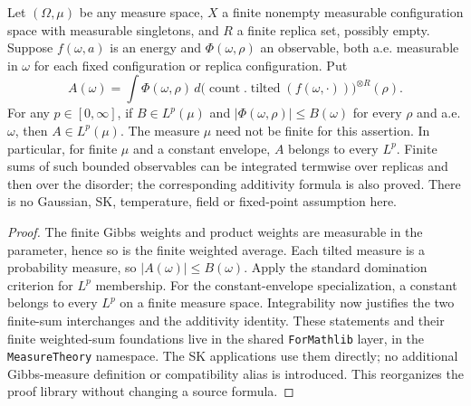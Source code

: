 \begin{lemma}
\label{lem:sg-tal:finite-tilted-calculus}
\leanok
{}
Let $(\Omega,\mu)$ be any measure space, $X$ a finite nonempty measurable configuration
space with measurable singletons, and $R$ a finite replica set, possibly empty.
Suppose $f(\omega,a)$ is an energy and $\Phi(\omega,\rho)$ an observable, both a.e.
measurable in $\omega$ for each fixed configuration or replica configuration. Put
\[
 A(\omega)=\int\Phi(\omega,\rho)\,
 d\bigl(\operatorname{count}.\operatorname{tilted}(f(\omega,\cdot))\bigr)^{\otimes R}(\rho).
\]
For any $p\in[0,\infty]$, if $B\in L^p(\mu)$ and
$|\Phi(\omega,\rho)|\le B(\omega)$ for every $\rho$ and a.e. $\omega$, then
$A\in L^p(\mu)$. The measure $\mu$ need not be finite for this assertion.
In particular, for finite $\mu$ and a constant envelope, $A$ belongs to every $L^p$.
Finite sums of such bounded observables can be integrated termwise over replicas
and then over the disorder; the corresponding additivity formula is also proved.
There is no Gaussian, SK, temperature, field or fixed-point assumption here.
\end{lemma}
\begin{proof}
\leanok
The finite Gibbs weights and product weights are measurable in the parameter, hence
so is the finite weighted average. Each tilted measure is a probability measure, so
$|A(\omega)|\le B(\omega)$. Apply the standard domination criterion for $L^p$ membership.
For the constant-envelope specialization, a constant belongs to every $L^p$ on a
finite measure space. Integrability now justifies the two finite-sum interchanges
and the additivity identity.
These statements and their finite weighted-sum foundations live in the shared
\texttt{ForMathlib} layer, in the \texttt{MeasureTheory} namespace. The SK applications
use them directly; no additional Gibbs-measure definition or compatibility alias
is introduced. This reorganizes the proof library without changing a source formula.
\end{proof}

